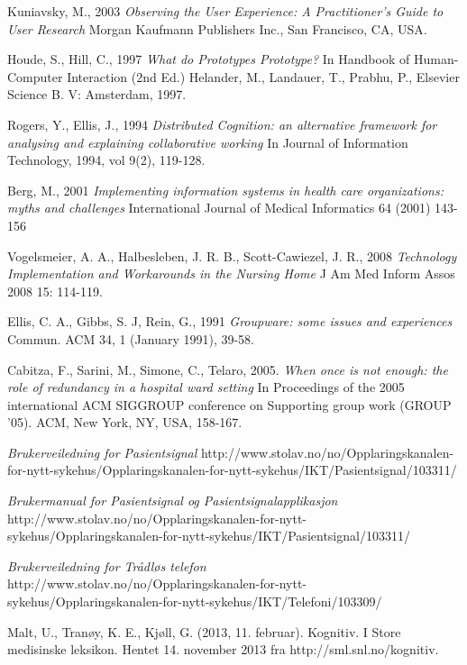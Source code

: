 \documentclass[b5paper, 11pt, norsk]{MScthesisITEM}
\begin{document}
\begin{thebibliography}{99}
Kuniavsky, M., 2003 
\emph{Observing the User Experience: A Practitioner's Guide to User Research}
Morgan Kaufmann Publishers Inc., San Francisco, CA, USA.

Houde, S., Hill, C., 1997
\emph{What do Prototypes Prototype?}
In Handbook of Human-Computer Interaction (2nd Ed.)
Helander, M., Landauer, T., Prabhu, P.,
Elsevier Science B. V:
Amsterdam, 1997.

Rogers, Y., Ellis, J., 1994
\emph{Distributed Cognition: an alternative framework for analysing and explaining collaborative working}
In Journal of Information Technology, 1994, vol 9(2), 119-128.

Berg, M., 2001
\emph{Implementing information systems in health care organizations: myths and challenges}
International Journal of Medical Informatics 64 (2001) 143-156

Vogelsmeier, A. A., Halbesleben, J. R. B., Scott-Cawiezel, J. R., 2008
\emph{Technology Implementation and Workarounds in the Nursing Home}
J Am Med Inform Assos 2008 15: 114-119.

Ellis, C. A., Gibbs, S. J, Rein, G., 1991
\emph{Groupware: some issues and experiences} 
Commun. ACM 34, 1 (January 1991), 39-58.

Cabitza, F., Sarini, M., Simone, C., Telaro, 2005.
\emph{When once is not enough: the role of redundancy in a hospital ward setting}
In Proceedings of the 2005 international ACM SIGGROUP conference on Supporting group work (GROUP '05). ACM, New York, NY, USA, 158-167.

\emph{Brukerveiledning for Pasientsignal}
http://www.stolav.no/no/Opplaringskanalen-for-nytt-sykehus/Opplaringskanalen-for-nytt-sykehus/IKT/Pasientsignal/103311/

\emph{Brukermanual for Pasientsignal og Pasientsignalapplikasjon}
http://www.stolav.no/no/Opplaringskanalen-for-nytt-sykehus/Opplaringskanalen-for-nytt-sykehus/IKT/Pasientsignal/103311/

\emph{Brukerveiledning for Trådløs telefon}
http://www.stolav.no/no/Opplaringskanalen-for-nytt-sykehus/Opplaringskanalen-for-nytt-sykehus/IKT/Telefoni/103309/

Malt, U., Tranøy, K. E., Kjøll, G. (2013, 11. februar). Kognitiv. I Store medisinske leksikon. Hentet 14. november 2013 fra http://sml.snl.no/kognitiv.
\end{thebibliography}

\appendix
{}
 \renewcommand{\chaptername}{\appendixname}


\end{document}
